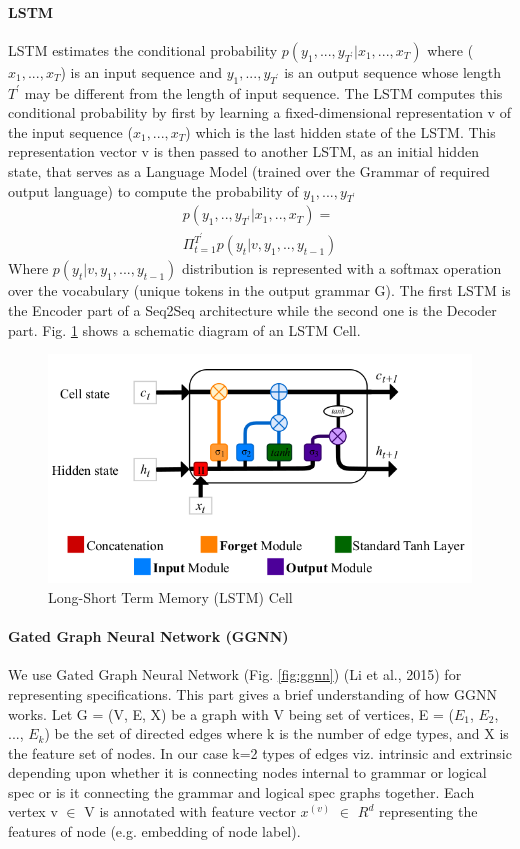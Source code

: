 \paragraph{LSTM}
LSTM estimates the conditional probability $p(y_1,...,y_{T^{'}} | x_1,...,x_T)$ where ($x_1,...,x_T$) is an input sequence and $y_1,...,y_{T^{'}}$ is an output sequence whose length $T^{'}$ may be different from the length of input sequence. The LSTM computes this conditional probability by first by learning a fixed-dimensional representation v of the input sequence ($x_1,...,x_T$) which is the last hidden state of the LSTM. This representation vector v is then passed to another LSTM, as an initial hidden state, that serves as a Language Model (trained over the Grammar of required output language) to compute the probability of $y_1,...,y_{T^{'}}$ \begin{align*}
    p(y_1,..,y_{T^{'}} | x_1,..,x_T) = \\ \Pi_{t=1}^{T^{'}}p(y_t|v,y_1,..,y_{t-1})
\end{align*}
Where $p(y_t | v,y_1,...,y_{t-1})$ distribution is represented with a softmax operation over the vocabulary (unique tokens in the output grammar G). The first LSTM is the Encoder part of a Seq2Seq architecture while the second one is the Decoder part. Fig. \ref{fig:lstm} shows a schematic diagram of an LSTM Cell.

\begin{figure}
    \centering
    \includegraphics[scale=0.4]{lstm.png}
    \caption{Long-Short Term Memory (LSTM) Cell}
    \label{fig:lstm}
\end{figure}

\paragraph{Gated Graph Neural Network (GGNN)}
\label{gnn}
We use Gated Graph Neural Network (Fig. \ref{fig:ggnn}) (Li et al., 2015)\cite{li2015gated} for representing specifications. This part gives a brief understanding of how GGNN works. Let G = (V, E, X) be a graph with V being set of vertices, E = ($E_1$, $E_2$, ..., $E_k$) be the set of directed edges where k is the number of edge types, and X is the feature set of nodes. In our case k=2 types of edges viz. intrinsic and extrinsic depending upon whether it is connecting nodes internal to grammar or logical spec or is it connecting the grammar and logical spec graphs together. Each vertex v $\in$ V is annotated with feature vector $x^{(v)}$ $\in$ $R^d$ representing the features of node (e.g. embedding of node label).

